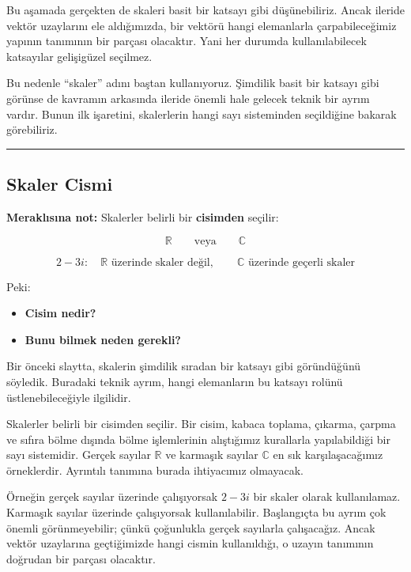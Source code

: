 \documentclass[
  a4paper,
  DIV=11,
  numbers=noendperiod]{scrartcl}
\providecommand{\tightlist}{%
  \setlength{\itemsep}{0pt}\setlength{\parskip}{0pt}}
\begin{document}
Bu aşamada gerçekten de skaleri basit bir katsayı gibi düşünebiliriz.
Ancak ileride vektör uzaylarını ele aldığımızda, bir vektörü hangi
elemanlarla çarpabileceğimiz yapının tanımının bir parçası olacaktır.
Yani her durumda kullanılabilecek katsayılar gelişigüzel seçilmez.

Bu nedenle ``skaler'' adını baştan kullanıyoruz. Şimdilik basit bir
katsayı gibi görünse de kavramın arkasında ileride önemli hale gelecek
teknik bir ayrım vardır. Bunun ilk işaretini, skalerlerin hangi sayı
sisteminden seçildiğine bakarak görebiliriz.

\begin{center}\rule{0.5\linewidth}{0.5pt}\end{center}

\subsection{Skaler Cismi}\label{skaler-cismi}

\textbf{Meraklısına not:} Skalerler belirli bir \textbf{cisimden}
seçilir:

\[
\mathbb{R}
\qquad\text{veya}\qquad
\mathbb{C}
\]

\[
2-3i:
\quad
\mathbb{R}\text{ üzerinde skaler değil},
\qquad
\mathbb{C}\text{ üzerinde geçerli skaler}
\]

Peki:

\begin{itemize}
\tightlist
\item
  \textbf{Cisim nedir?}
\item
  \textbf{Bunu bilmek neden gerekli?}
\end{itemize}

Bir önceki slaytta, skalerin şimdilik sıradan bir katsayı gibi
göründüğünü söyledik. Buradaki teknik ayrım, hangi elemanların bu
katsayı rolünü üstlenebileceğiyle ilgilidir.

Skalerler belirli bir cisimden seçilir. Bir cisim, kabaca toplama,
çıkarma, çarpma ve sıfıra bölme dışında bölme işlemlerinin alıştığımız
kurallarla yapılabildiği bir sayı sistemidir. Gerçek sayılar
\(\mathbb{R}\) ve karmaşık sayılar \(\mathbb{C}\) en sık
karşılaşacağımız örneklerdir. Ayrıntılı tanımına burada ihtiyacımız
olmayacak.

Örneğin gerçek sayılar üzerinde çalışıyorsak \(2-3i\) bir skaler olarak
kullanılamaz. Karmaşık sayılar üzerinde çalışıyorsak kullanılabilir.
Başlangıçta bu ayrım çok önemli görünmeyebilir; çünkü çoğunlukla gerçek
sayılarla çalışacağız. Ancak vektör uzaylarına geçtiğimizde hangi cismin
kullanıldığı, o uzayın tanımının doğrudan bir parçası olacaktır.
\end{document}
